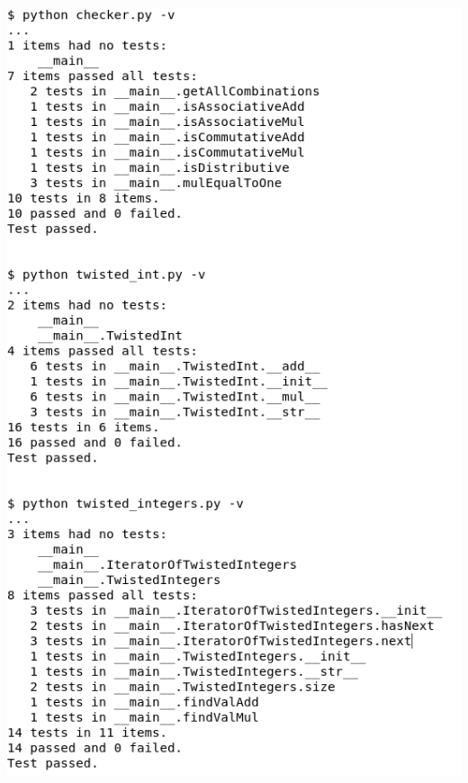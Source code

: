 \documentclass[11]{article}
\begin{document}
			\includegraphics[scale=0.5]{Test1.png} \\\\
\end{document}
